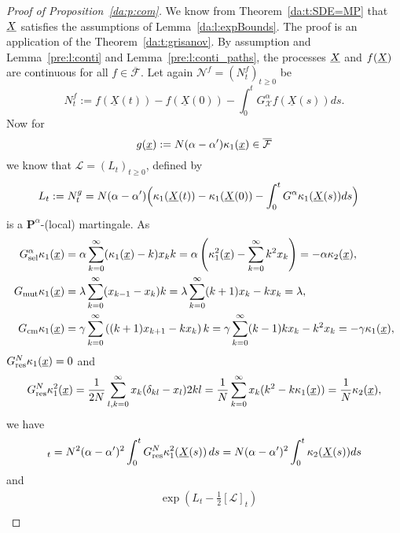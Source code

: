 \noindent
\begin{proof}[Proof of Proposition~\ref{da:p:com}]
We know from Theorem~\ref{da:t:SDE=MP} that $\underline{X}$ satisfies the assumptions of
Lemma~\ref{da:l:expBounds}.  The proof is an application of the Theorem~\eqref{da:t:grisanov}. 
By assumption and Lemma~\ref{pre:l:conti} and Lemma~\ref{pre:l:conti_paths}, the processes $\underline{X}$ and
$f(\underline{X})$ are continuous for all $f\in\overline{\mathcal F}$.
Let again $\mathcal N^f = (N^f_t)_{t\geq0}$ be
$$ N^f_t := f(\underline X(t)) - f(\underline X(0)) - \int_0^t G_{\mathcal X}^\alpha f(\underline
X(s))ds.$$ Now for
$$ g(\underline{x}):= N(\alpha - \alpha')\kappa_1(\underline{x}) \in \overline{\mathcal{F}} $$ 
we know that $\mathcal L = (L_t)_{t\geq 0}$, defined by
\begin{align*}
L_t &:= N^g_t 
= N(\alpha - \alpha') \Big(\kappa_1(\underline{X} \! \left( t \right)) - \kappa_1(\underline{X} \! \left( 0 \right)) - \int_0^t G^{\alpha}
    \kappa_1(\underline{X} \! \left( s \right)) ds \Big)  
\end{align*}
is a $\mathbf{P}^\alpha$-(local) martingale. As
\begin{align*}
G^{\alpha}_{\text{sel}} \kappa_1 \! \left( \underline{x} \right)
&= \alpha \sum_{k=0}^\infty (\kappa_1(\underline{x}) - k) x_k k 
= \alpha \left( \kappa_1^2(\underline{x}) - \sum_{k=0}^\infty k^2 x_k \right) 
= -\alpha \kappa_2(\underline{x}), \\
G_{\text{mut}} \kappa_1 \! \left( \underline{x} \right)
&= \lambda \sum_{k=0}^\infty ( x_{k-1} - x_k ) k 
= \lambda \sum_{k=0}^\infty (k+1) x_k - k x_k
= \lambda, \\
G_{\text{cm}} \kappa_1 \! \left( \underline{x} \right)
&= \gamma \sum_{k=0}^\infty \left( (k+1)x_{k+1} - k x_k \right) k
= \gamma \sum_{k=0}^\infty (k-1) k x_k - k^2 x_k
= - \gamma \kappa_1(\underline{x}),
\end{align*}
$G^{N}_{\text{res}} \kappa_1 \! \left( \underline{x} \right) = 0$ and 
\begin{align*}
G^{N}_{\text{res}} \kappa_1^2 \! \left( \underline{x} \right) 
= \frac{1}{2N} \sum_{l,k=0}^\infty x_k (\delta_{kl}-x_l) 2 k l
= \frac{1}{N} \sum_{k=0}^\infty x_k (k^2-k \kappa_1(\underline{x}))
= \frac{1}{N} \kappa_2(\underline{x}),
\end{align*}
we have
\begin{align*}
[\mathcal{L}]_t 
= N^2(\alpha-\alpha')^2 \int_0^t \GNresFX{\kappa_1^2}{\mrDifT{s}} ds 
= N(\alpha-\alpha')^2 \int_0^t \kappa_2(\mrDifT{s}) ds
\end{align*}
and
\begin{align*}
&\exp\! \left( L_t - \frac{1}{2}[\mathcal{L}]_t \right) \\

\end{align*}
\end{proof}
